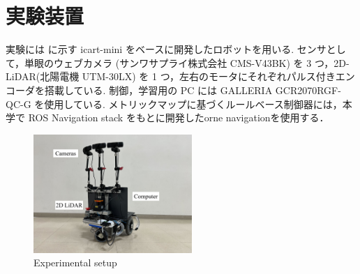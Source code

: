\section{実験装置}
実験には  に示す icart-mini\cite{icart} をベースに開発したロボットを用いる.
センサとして，単眼のウェブカメラ (サンワサプライ株式会社 CMS-V43BK) を 3 つ，2D-LiDAR(北陽電機 UTM-30LX) を 1 つ，左右のモータにそれぞれパルス付きエンコーダを搭載している.
制御，学習用の PC には GALLERIA GCR2070RGF-QC-G を使用している.
メトリックマップに基づくルールベース制御器には，本学で ROS Navigation stack をもとに開発したorne navigation\cite{orne_nav}を使用する．

\begin{figure}[htbp]
    \centering
     \includegraphics[width=60mm]{images/pdf/ishiguro/gamma.pdf}
     \caption{Experimental setup}
     \label{fig:gamma}
\end{figure}
